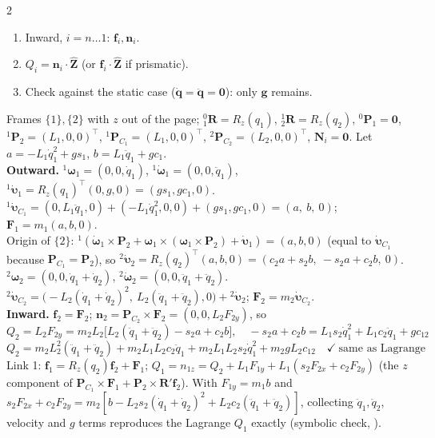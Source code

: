 \begin{multicols}{2}
\begin{recipe}
\begin{enumerate}
\item Inward, $i=n\ldots1$: $\mathbf f_i,\mathbf n_i$.
\item $Q_i=\mathbf n_i\cdot\hat{\mathbf Z}$ (or $\mathbf f_i\cdot\hat{\mathbf Z}$ if prismatic).
\item Check against the static case ($\dot{\mathbf q}=\ddot{\mathbf q}=\mathbf 0$): only $\mathbf g$ remains.
\end{enumerate}
\end{recipe}
\begin{deriv}
Frames $\{1\},\{2\}$ with $z$ out of the page; ${}^0_1\mathbf R=R_z(q_1)$, ${}^1_2\mathbf R=R_z(q_2)$, ${}^0\mathbf P_1=\mathbf 0$, ${}^1\mathbf P_2=(L_1,0,0)^\top$, ${}^1\mathbf P_{C_1}=(L_1,0,0)^\top$, ${}^2\mathbf P_{C_2}=(L_2,0,0)^\top$, $\mathbf N_i=\mathbf 0$. Let $a=-L_1\dot q_1^2+gs_1$, $b=L_1\ddot q_1+gc_1$.\\
\textbf{Outward.} ${}^1\boldsymbol\omega_1=(0,0,\dot q_1)$, ${}^1\dot{\boldsymbol\omega}_1=(0,0,\ddot q_1)$, ${}^1\dot{\boldsymbol\upsilon}_1=R_z(q_1)^\top(0,g,0)=(gs_1,gc_1,0)$.\\
${}^1\dot{\boldsymbol\upsilon}_{C_1}=(0,L_1\ddot q_1,0)+(-L_1\dot q_1^2,0,0)+(gs_1,gc_1,0)=(a,\ b,\ 0)$; $\mathbf F_1=m_1(a,b,0)$.\\
Origin of $\{2\}$: ${}^1(\dot{\boldsymbol\omega}_1\times\mathbf P_2+\boldsymbol\omega_1\times(\boldsymbol\omega_1\times\mathbf P_2)+\dot{\boldsymbol\upsilon}_1)=(a,b,0)$ (equal to $\dot{\boldsymbol\upsilon}_{C_1}$ because $\mathbf P_{C_1}=\mathbf P_2$), so ${}^2\dot{\boldsymbol\upsilon}_2=R_z(q_2)^\top(a,b,0)=(c_2a+s_2b,\ -s_2a+c_2b,\ 0)$. ${}^2\boldsymbol\omega_2=(0,0,\dot q_1+\dot q_2)$, ${}^2\dot{\boldsymbol\omega}_2=(0,0,\ddot q_1+\ddot q_2)$.\\
${}^2\dot{\boldsymbol\upsilon}_{C_2}=\big(-L_2(\dot q_1+\dot q_2)^2,\ L_2(\ddot q_1+\ddot q_2),0\big)+{}^2\dot{\boldsymbol\upsilon}_2$; $\mathbf F_2=m_2\dot{\boldsymbol\upsilon}_{C_2}$.\\
\textbf{Inward.} $\mathbf f_2=\mathbf F_2$; $\mathbf n_2=\mathbf P_{C_2}\times\mathbf F_2=(0,0,L_2F_{2y})$, so
\[Q_2=L_2F_{2y}=m_2L_2\big[L_2(\ddot q_1+\ddot q_2)-s_2a+c_2b\big],\quad -s_2a+c_2b=L_1s_2\dot q_1^2+L_1c_2\ddot q_1+gc_{12}\]
\[Q_2=m_2L_2^2(\ddot q_1+\ddot q_2)+m_2L_1L_2c_2\ddot q_1+m_2L_1L_2s_2\dot q_1^2+m_2gL_2c_{12}\quad\checkmark\ \text{same as Lagrange}\]
Link 1: $\mathbf f_1=R_z(q_2)\mathbf f_2+\mathbf F_1$; $Q_1=n_{1z}=Q_2+L_1F_{1y}+L_1(s_2F_{2x}+c_2F_{2y})$ (the $z$ component of $\mathbf P_{C_1}\times\mathbf F_1+\mathbf P_2\times\mathbf R'\mathbf f_2$). With $F_{1y}=m_1b$ and $s_2F_{2x}+c_2F_{2y}=m_2[b-L_2s_2(\dot q_1+\dot q_2)^2+L_2c_2(\ddot q_1+\ddot q_2)]$, collecting $\ddot q_1,\ddot q_2$, velocity and $g$ terms reproduces the Lagrange $Q_1$ exactly (symbolic check, \chk).

\end{deriv}
\end{multicols}
